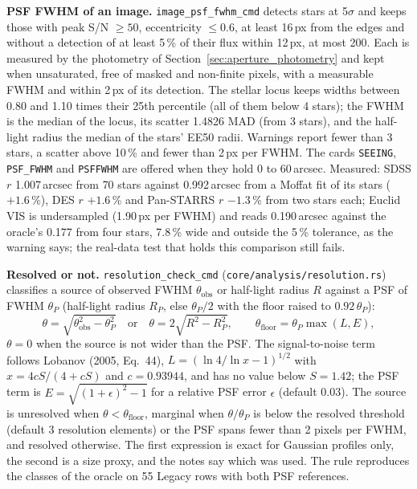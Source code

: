 \documentclass[11pt,a4paper]{article}
\newcommand{\code}[1]{\texttt{\small #1}}
\begin{document}
    \textbf{PSF FWHM of an image.} \code{image\_psf\_fwhm\_cmd} detects stars at 5$\sigma$ and keeps those with peak S/N $\ge 50$, eccentricity $\le 0.6$, at least 16\,px from the edges and without a detection of at least 5\,\% of their flux within 12\,px, at most 200. Each is measured by the photometry of Section~\ref{sec:aperture_photometry} and kept when unsaturated, free of masked and non-finite pixels, with a measurable FWHM and within 2\,px of its detection. The stellar locus keeps widths between 0.80 and 1.10 times their 25th percentile (all of them below 4 stars); the FWHM is the median of the locus, its scatter 1.4826 MAD (from 3 stars), and the half-light radius the median of the stars' EE50 radii. Warnings report fewer than 3 stars, a scatter above 10\,\% and fewer than 2\,px per FWHM. The cards \code{SEEING}, \code{PSF\_FWHM} and \code{PSFFWHM} are offered when they hold 0 to 60\,arcsec. Measured: SDSS $r$ 1.007\,arcsec from 70 stars against 0.992\,arcsec from a Moffat fit of its stars ($+1.6$\,\%), DES $r$ $+1.6$\,\% and Pan-STARRS $r$ $-1.3$\,\% from two stars each; Euclid VIS is undersampled (1.90\,px per FWHM) and reads 0.190\,arcsec against the oracle's 0.177 from four stars, 7.8\,\% wide and outside the 5\,\% tolerance, as the warning says; the real-data test that holds this comparison still fails.

    \textbf{Resolved or not.} \code{resolution\_check\_cmd} (\code{core/analysis/resolution.rs}) classifies a source of observed FWHM $\theta_{\text{obs}}$ or half-light radius $R$ against a PSF of FWHM $\theta_P$ (half-light radius $R_P$, else $\theta_P/2$ with the floor raised to $0.92\,\theta_P$):
    \begin{equation}
        \theta = \sqrt{\theta_{\text{obs}}^2 - \theta_P^2} \quad\text{or}\quad \theta = 2\sqrt{R^2 - R_P^2}, \qquad
        \theta_{\text{floor}} = \theta_P \max(L, E),
    \end{equation}
    $\theta = 0$ when the source is not wider than the PSF. The signal-to-noise term follows Lobanov (2005, Eq.~44), $L = \left(\ln 4/\ln x - 1\right)^{1/2}$ with $x = 4cS/(4 + cS)$ and $c = 0.93944$, and has no value below $S = 1.42$; the PSF term is $E = \sqrt{(1 + \epsilon)^2 - 1}$ for a relative PSF error $\epsilon$ (default 0.03). The source is unresolved when $\theta < \theta_{\text{floor}}$, marginal when $\theta/\theta_P$ is below the resolved threshold (default 3 resolution elements) or the PSF spans fewer than 2 pixels per FWHM, and resolved otherwise. The first expression is exact for Gaussian profiles only, the second is a size proxy, and the notes say which was used. The rule reproduces the classes of the oracle on 55 Legacy rows with both PSF references.
\end{document}
